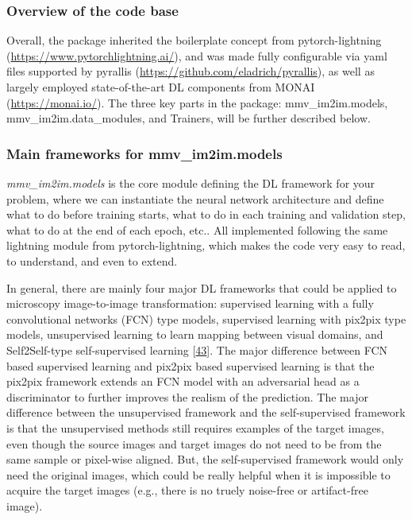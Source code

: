 \hypertarget{overview-of-the-code-base}{%
\subsubsection{Overview of the code base}\label{overview-of-the-code-base}}

Overall, the package inherited the boilerplate concept from pytorch-lightning (\url{https://www.pytorchlightning.ai/}), and was made fully configurable via yaml files supported by pyrallis (\url{https://github.com/eladrich/pyrallis}), as well as largely employed state-of-the-art DL components from MONAI (\url{https://monai.io/}). The three key parts in the package: mmv\_im2im.models, mmv\_im2im.data\_modules, and Trainers, will be further described below.

\hypertarget{main-frameworks-for-mmv_im2im.models}{%
\subsubsection{Main frameworks for mmv\_im2im.models}\label{main-frameworks-for-mmv_im2im.models}}

\emph{mmv\_im2im.models} is the core module defining the DL framework for your problem, where we can instantiate the neural network architecture and define what to do before training starts, what to do in each training and validation step, what to do at the end of each epoch, etc.. All implemented following the same lightning module from pytorch-lightning, which makes the code very easy to read, to understand, and even to extend.

In general, there are mainly four major DL frameworks that could be applied to microscopy image-to-image transformation: supervised learning with a fully convolutional networks (FCN) type models, supervised learning with pix2pix type models, unsupervised learning to learn mapping between visual domains, and Self2Self-type self-supervised learning {[}\protect\hyperlink{ref-tuObtXMR}{43}{]}. The major difference between FCN based supervised learning and pix2pix based supervised learning is that the pix2pix framework extends an FCN model with an adversarial head as a discriminator to further improves the realism of the prediction. The major difference between the unsupervised framework and the self-supervised framework is that the unsupervised methods still requires examples of the target images, even though the source images and target images do not need to be from the same sample or pixel-wise aligned. But, the self-supervised framework would only need the original images, which could be really helpful when it is impossible to acquire the target images (e.g., there is no truely noise-free or artifact-free image).

